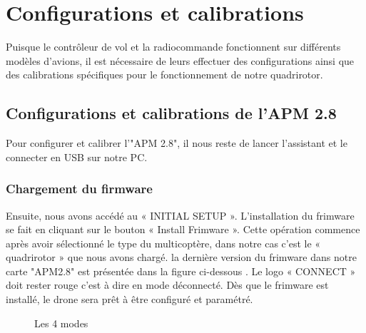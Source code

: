 	
	\section{Configurations et calibrations}
	Puisque le contrôleur de vol et la radiocommande fonctionnent sur différents modèles d'avions, il est nécessaire de leurs effectuer des configurations  ainsi que  des calibrations spécifiques pour le fonctionnement de notre quadrirotor. 
	\subsection{Configurations et calibrations de l'APM 2.8}
	Pour configurer et calibrer l'"APM 2.8", il nous reste  de lancer l'assistant et le connecter en USB sur notre PC.
	\subsubsection{Chargement du firmware }
	Ensuite, nous avons accédé au « INITIAL SETUP ». L'installation du frimware se fait en cliquant sur le bouton « Install Frimware ». Cette opération commence après avoir sélectionné le type du multicoptère, dans notre cas c'est le « quadrirotor » que nous avons chargé.  la dernière version du frimware dans
	notre carte "APM2.8" est présentée dans la figure ci-dessous . Le logo « CONNECT » doit rester rouge c'est à dire en mode déconnecté. Dès que le frimware est installé, le drone sera prêt à être configuré et paramétré.
	\begin{figure}[H]
		\begin{center}
			\centering
		\end{center}
		\caption{Les 4 modes}
	\end{figure}
	
